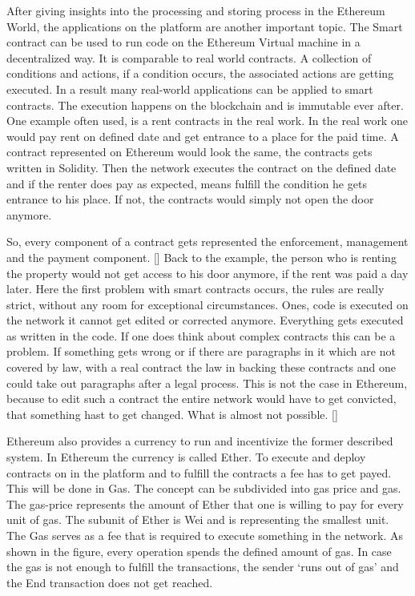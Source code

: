After giving insights into the processing and storing process in the Ethereum World, the applications on the platform are another important topic. The Smart contract can be used to run code on the Ethereum Virtual machine in a decentralized way. It is comparable to real world contracts. A collection of conditions and actions, if a condition occurs, the associated actions are getting executed. In a result many real-world applications can be applied to smart contracts. The execution happens on the blockchain and is immutable ever after. 
One example often used, is a rent contracts in the real work. In the real work one would pay rent on defined date and get entrance to a place for the paid time. A contract represented on Ethereum would look the same, the contracts gets written in Solidity. Then the network executes the contract on the defined date and if the renter does pay as expected, means fulfill the condition he gets entrance to his place. If not, the contracts would simply not open the door anymore. 

So, every component of a contract gets represented the enforcement, management and the payment component. [] Back to the example, the person who is renting the property would not get access to his door anymore, if the rent was paid a day later. Here the first problem with smart contracts occurs, the rules are really strict, without any room for exceptional circumstances. Ones, code is executed on the network it cannot get edited or corrected anymore. 
Everything gets executed as written in the code. If one does think about complex contracts this can be a problem. If something gets wrong or if there are paragraphs in it which are not covered by law, with a real contract the law in backing these contracts and one could take out paragraphs after a legal process. This is not the case in Ethereum, because to edit such a contract the entire network would have to get convicted, that something hast to get changed. What is almost not possible. []

Ethereum also provides a currency to run and incentivize the former described system. In Ethereum the currency is called Ether. To execute and deploy contracts on in the platform and to fulfill the contracts a fee has to get payed. This will be done in Gas. The concept can be subdivided into gas price and gas. The gas-price represents the amount of Ether that one is willing to pay for every unit of gas. The subunit of Ether is Wei and is representing the smallest unit. The Gas serves as a fee that is required to execute something in the network. As shown in the figure, every operation spends the defined amount of gas. In case the gas is not enough to fulfill the transactions, the sender ‘runs out of gas’ and the End transaction does not get reached. 


